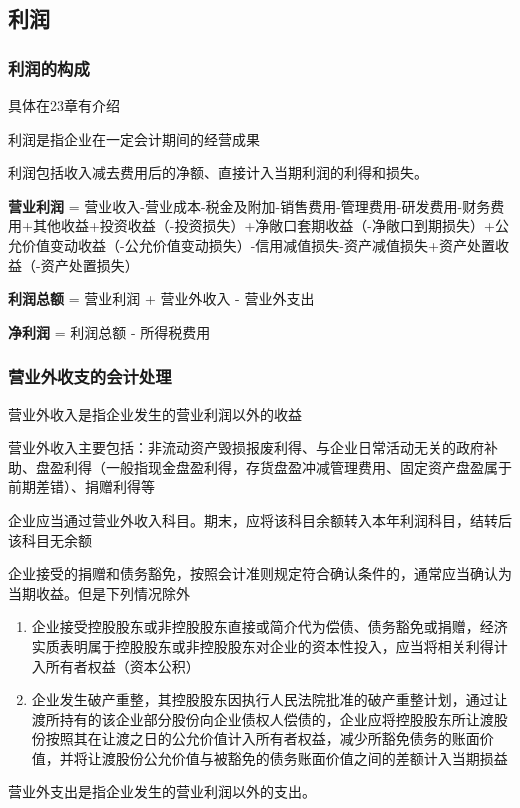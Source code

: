 \documentclass[UTF8,12pt]{ctexart}
\numberwithin{equation}{section} %
\numberwithin{figure}{section}
\numberwithin{table}{section}
\begin{document}
	\subsection{利润}
	\subsubsection{利润的构成}
	具体在23章有介绍
	
	利润是指企业在一定会计期间的经营成果
	
	利润包括收入减去费用后的净额、直接计入当期利润的利得和损失。
	
	\textbf{营业利润} = 营业收入-营业成本-税金及附加-销售费用-管理费用-研发费用-财务费用+其他收益+投资收益（-投资损失）+净敞口套期收益（-净敞口到期损失）+公允价值变动收益（-公允价值变动损失）-信用减值损失-资产减值损失+资产处置收益（-资产处置损失）
	
	\textbf{利润总额} = 营业利润 + 营业外收入 - 营业外支出
	
	\textbf{净利润} = 利润总额 - 所得税费用
	
	\subsubsection{营业外收支的会计处理}
	营业外收入是指企业发生的营业利润以外的收益
	
	营业外收入主要包括：非流动资产毁损报废利得、与企业日常活动无关的政府补助、盘盈利得（一般指现金盘盈利得，存货盘盈冲减管理费用、固定资产盘盈属于前期差错）、捐赠利得等
	
	企业应当通过营业外收入科目。期末，应将该科目余额转入本年利润科目，结转后该科目无余额
	
	企业接受的捐赠和债务豁免，按照会计准则规定符合确认条件的，通常应当确认为当期收益。但是下列情况除外
	\begin{enumerate}
		\item 企业接受控股股东或非控股股东直接或简介代为偿债、债务豁免或捐赠，经济实质表明属于控股股东或非控股股东对企业的资本性投入，应当将相关利得计入所有者权益（资本公积）
		
		\item 企业发生破产重整，其控股股东因执行人民法院批准的破产重整计划，通过让渡所持有的该企业部分股份向企业债权人偿债的，企业应将控股股东所让渡股份按照其在让渡之日的公允价值计入所有者权益，减少所豁免债务的账面价值，并将让渡股份公允价值与被豁免的债务账面价值之间的差额计入当期损益
	\end{enumerate}
	
	营业外支出是指企业发生的营业利润以外的支出。
	
\end{document}
